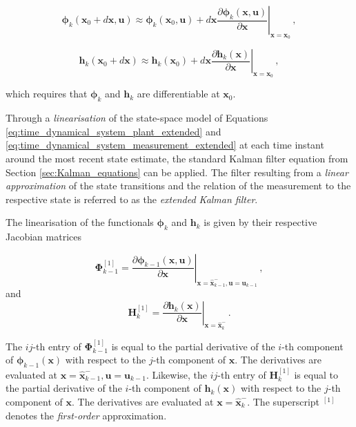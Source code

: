 \begin{equation}\label{eq:linear_phi}
  \bm{\phi}_{k}(\mathbf{x}_0 + d \mathbf{x}, \mathbf{u}) \approx \bm{\phi}_{k}(\mathbf{x}_0, \mathbf{u}) + d \mathbf{x} \left. \frac{\partial \bm{\phi}_{k}(\mathbf{x}, \mathbf{u})}{\partial \mathbf{x}} \right|_{\mathbf{x} = \mathbf{x}_0}\,,
\end{equation}

\begin{equation}\label{eq:linear_h}
  \mathbf{h}_{k}(\mathbf{x}_0 + d \mathbf{x}) \approx \mathbf{h}_{k}(\mathbf{x}_0) + d \mathbf{x} \left. \frac{\partial \mathbf{h}_{k}(\mathbf{x})}{\partial \mathbf{x}} \right|_{\mathbf{x} = \mathbf{x}_0}\,,
\end{equation}

\noindent
which requires that $\bm{\phi}_k$ and $\mathbf{h}_k$ are differentiable at $\mathbf{x}_0$.

Through a \emph{linearisation} of the state-space model of Equations \ref{eq:time_dynamical_system_plant_extended} and \ref{eq:time_dynamical_system_measurement_extended} at each time instant around the most recent state estimate, the standard Kalman filter equation from Section \ref{sec:Kalman_equations} can be applied. The filter resulting from a \emph{linear approximation} of the state transitions and the relation of the measurement to the respective state is referred to as the \emph{extended Kalman filter}.

The linearisation of the functionals $\bm{\phi}_k$ and $\mathbf{h}_k$ is given by their respective Jacobian matrices  

\begin{equation}\label{eq:Phi_first_order}
  \bm{\Phi}^{[1]}_{k-1} =  \left. \frac{\partial \bm{\phi}_{k-1}(\mathbf{x}, \mathbf{u})}{\partial \mathbf{x}} \right|_{\mathbf{x}=\hat{\mathbf{x}}^-_{k-1}, \mathbf{u} = \mathbf{u}_{k-1}} \,,
\end{equation}
and
\begin{equation}\label{eq:H_first_order}
  \mathbf{H}^{[1]}_{k} = \left. \frac{\partial \mathbf{h}_{k}(\mathbf{x})}{\partial \mathbf{x}} \right|_{\mathbf{x}=\hat{\mathbf{x}}^-_{k}} \,.
\end{equation}

\noindent
The $ij$-th entry of $\bm{\Phi}^{[1]}_{k-1}$ is equal to the partial derivative of the $i$-th component of $\bm{\phi}_{k-1}(\mathbf{x})$ with respect to the $j$-th component of $\mathbf{x}$. The derivatives are evaluated at $\mathbf{x}=\hat{\mathbf{x}}^-_{k-1}, \mathbf{u} = \mathbf{u}_{k-1}$. Likewise, the $ij$-th entry of $\mathbf{H}^{[1]}_{k}$ is equal to the partial derivative of the $i$-th component of $\mathbf{h}_{k}(\mathbf{x})$ with respect to the $j$-th component of $\mathbf{x}$. The derivatives are evaluated at $\mathbf{x}=\hat{\mathbf{x}}^-_{k}$. The superscript $^{[1]}$ denotes the \emph{first-order} approximation.


